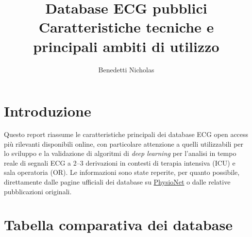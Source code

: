 \documentclass[11pt,a4paper]{article}
\title{\textbf{Database ECG pubblici} \\
\large Caratteristiche tecniche e principali ambiti di utilizzo}
\author{Benedetti Nicholas}
\begin{document}
\maketitle
\thispagestyle{fancy}

\section*{Introduzione}
Questo report riassume le caratteristiche principali dei database ECG open access più rilevanti disponibili online, con particolare attenzione a quelli utilizzabili per lo sviluppo e la validazione di algoritmi di \emph{deep learning} per l'analisi in tempo reale di segnali ECG a 2--3 derivazioni in contesti di terapia intensiva (ICU) e sala operatoria (OR). Le informazioni sono state reperite, per quanto possibile, direttamente dalle pagine ufficiali dei database su \href{https://physionet.org}{PhysioNet} o dalle relative pubblicazioni originali.

\section*{Tabella comparativa dei database}
\end{document}
